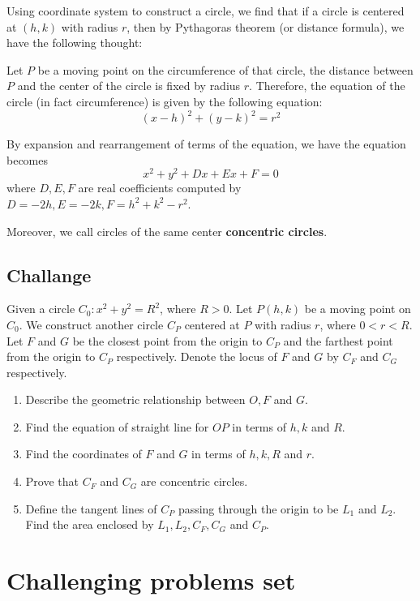 \documentclass[12pt]{article}
\begin{document}
    Using coordinate system to construct a circle, we find that if a circle is centered at $(h,k)$ with radius $r$, then by Pythagoras theorem (or distance formula), we have the following thought:

    Let $P$ be a moving point on the circumference of that circle, the distance between $P$ and the center of the circle is fixed by radius $r$. Therefore, the equation of the circle (in fact circumference) is given by the following equation: $$(x-h)^2+(y-k)^2=r^2$$

    By expansion and rearrangement of terms of the equation, we have the equation becomes $$x^2+y^2+Dx+Ex+F=0$$ where $D,E,F$ are real coefficients computed by $D=-2h, E=-2k, F=h^2+k^2-r^2$.

    Moreover, we call circles of the same center \textbf{concentric circles}.

    \subsection*{Challange}

    Given a circle $C_0:x^2+y^2=R^2$, where $R>0$. Let $P(h,k)$ be a moving point on $C_0$. We construct another circle $C_P$ centered at $P$ with radius $r$, where $0<r<R$. Let $F$ and $G$ be the closest point from the origin to $C_P$ and the farthest point from the origin to $C_P$ respectively. Denote the locus of $F$ and $G$ by $C_F$ and $C_G$ respectively.

    \begin{enumerate}
        \item Describe the geometric relationship between $O,F$ and $G$.
        \item Find the equation of straight line for $OP$ in terms of $h,k$ and $R$.
        \item Find the coordinates of $F$ and $G$ in terms of $h,k,R$ and $r$.
        \item Prove that $C_F$ and $C_G$ are concentric circles.
        \item Define the tangent lines of $C_P$ passing through the origin to be $L_1$ and $L_2$. Find the area enclosed by $L_1,L_2,C_F,C_G$ and $C_P$.
    \end{enumerate}

    \newpage

    \section*{Challenging problems set}
\end{document}
